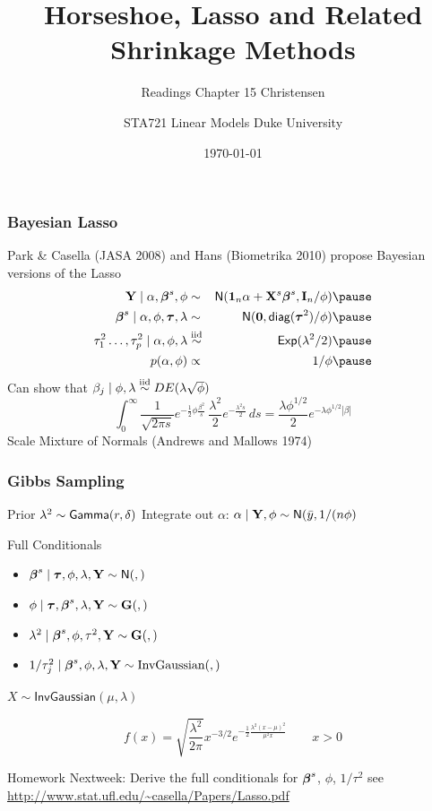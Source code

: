 \documentclass[handout]{beamer}
\title{Horseshoe, Lasso and Related Shrinkage Methods}
\subtitle{Readings Chapter 15 Christensen}
\institute{Merlise Clyde}
\author{STA721 Linear Models Duke University}
\date{\today}
\begin{document}
\maketitle
\begin{frame}
  \frametitle{Bayesian Lasso}
  Park \& Casella (JASA 2008) and Hans (Biometrika 2010) propose
  Bayesian versions of the Lasso  \pause
  \begin{eqnarray*}
    \Y \mid \alpha, \b^s, \phi & \sim & \N(\one_n \alpha + \X^s \b^s, \I_n/\phi)  \pause\\
    \b^s \mid \alpha, \phi, \taub, \lambda & \sim & \N(\zero, \diag(\taub^2)/\phi)  \pause\\
    \tau_1^2 \ldots, \tau_p^2 \mid \alpha, \phi, \lambda & \simiid & \Ex(\lambda^2/2)  \pause\\
    p(\alpha, \phi) & \propto& 1/\phi  \pause\\
  \end{eqnarray*}
Can show that $\beta_j \mid \phi, \lambda \mathrel{\mathop{\sim}\limits^{\rm iid}} DE(\lambda \sqrt{\phi})$
$$\int_0^\infty \frac{1}{\sqrt{2 \pi s}}
  e^{-\frac{1}{2} \phi \frac{\beta^2}{s }}
  \, \frac{\lambda^2}{2} e^{- \frac{\lambda^2 s}{2}}\, ds =
  \frac{\lambda \phi^{1/2}}{2} e^{-\lambda \phi^{1/2} |\beta|}
$$  \pause
Scale Mixture of Normals  (Andrews and Mallows 1974)
\end{frame}



\begin{frame}
  \frametitle{Gibbs Sampling}

Prior  $\lambda^2 \sim \textsf{Gamma}(r,\delta)$ \pause  Integrate out $\alpha$: $\alpha \mid \mathbf{Y}, \phi \sim \textsf{N}(\bar{y},     1/(n \phi)$  \pause

Full Conditionals
  \begin{itemize}
 \item $\boldsymbol{\beta}^s \mid \boldsymbol{\tau}, \phi, \lambda, \mathbf{Y} \sim \textsf{N}(, )$   \pause
\item $\phi \mid \boldsymbol{\tau}, \boldsymbol{\beta}^s, \lambda, \mathbf{Y} \sim \mathbf{G}( , ) $  \pause
\item $\lambda^2\mid  \boldsymbol{\beta}^s, \phi, \tau^2, \mathbf{Y} \sim \mathbf{G}( , )$ \pause
\item $1/\tau_j^2 \mid \boldsymbol{\beta}^s, \phi, \lambda, \mathbf{Y} \sim \text{InvGaussian}(
  , )$  \pause
 \end{itemize}
$X \sim \textsf{InvGaussian}(\mu,  \lambda)$

$$
f(x) =  \sqrt{\frac{\lambda^2}{2 \pi}}  x^{-3/2} e^{- \frac{1}{2} \frac{
    \lambda^2( x - \mu)^2} {\mu^2 x}} \qquad x > 0
$$  \pause

Homework Nextweek:  Derive the full conditionals for $\boldsymbol{\beta}^s$, $\phi$,
$1/\tau^2$  see \url{http://www.stat.ufl.edu/~casella/Papers/Lasso.pdf} 
\end{frame}
\end{document}
